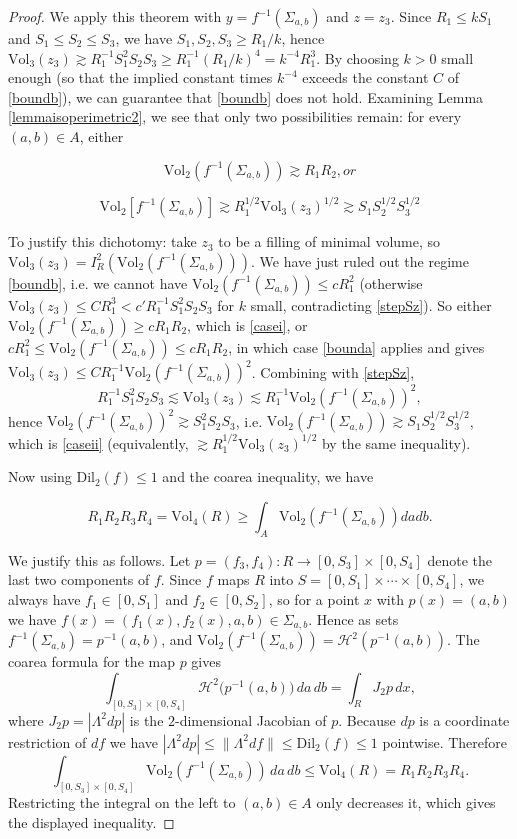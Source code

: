 \documentclass{amsart}
\newtheorem*{theorem 1}{Theorem 1}
\newtheorem*{theorem 2}{Theorem 2}
\newtheorem*{theorem 3}{Theorem 3}
\numberwithin{equation}{section}
\newcommand{\Dil}{\textrm{Dil}}
\newcommand{\Vol}{\textrm{Vol}}
\begin{document}
\begin{proof}
We apply this theorem with $y = f^{-1}(\Sigma_{a,b})$ and $z = z_3$.   Since $R_1 \le k S_1$ and $S_1 \le S_2 \le S_3$, we have $S_1, S_2, S_3 \ge R_1/k$, hence $\Vol_3(z_3) \gtrsim R_1^{-1} S_1^2 S_2 S_3 \ge R_1^{-1}(R_1/k)^4 = k^{-4} R_1^3$.   By choosing $k > 0$ small enough (so that the implied constant times $k^{-4}$ exceeds the constant $C$ of \eqref{boundb}),  we can guarantee that \eqref{boundb} does not hold.   Examining Lemma \ref{lemmaisoperimetric2},  we see that only two possibilities remain: for every $(a,b) \in A$,  either

\begin{equation} \label{casei} \Vol_2(f^{-1}(\Sigma_{a,b})) \gtrsim R_1 R_2,  or \end{equation}

\begin{equation} \label{caseii} \Vol_2[f^{-1}(\Sigma_{a,b})] \gtrsim R_1^{1/2} \Vol_3(z_3)^{1/2} \gtrsim S_1 S_2^{1/2} S_3^{1/2} \end{equation}

To justify this dichotomy: take $z_3$ to be a filling of minimal
volume, so $\Vol_3(z_3) = I_R^2(\Vol_2(f^{-1}(\Sigma_{a,b})))$.
We have just ruled out the regime \eqref{boundb}, i.e. we cannot
have $\Vol_2(f^{-1}(\Sigma_{a,b})) \le c R_1^2$ (otherwise
$\Vol_3(z_3) \le C R_1^3 < c' R_1^{-1} S_1^2 S_2 S_3$ for $k$ small,
contradicting \eqref{stepSz}).  So either
$\Vol_2(f^{-1}(\Sigma_{a,b})) \ge c R_1 R_2$, which is
\eqref{casei}, or $c R_1^2 \le \Vol_2(f^{-1}(\Sigma_{a,b})) \le c
R_1 R_2$, in which case \eqref{bounda} applies and gives
$\Vol_3(z_3) \le C R_1^{-1}\Vol_2(f^{-1}(\Sigma_{a,b}))^2$.
Combining with \eqref{stepSz},
$$ R_1^{-1} S_1^2 S_2 S_3 \lesssim \Vol_3(z_3) \lesssim R_1^{-1}
   \Vol_2(f^{-1}(\Sigma_{a,b}))^2, $$
hence $\Vol_2(f^{-1}(\Sigma_{a,b}))^2 \gtrsim S_1^2 S_2 S_3$, i.e.
$\Vol_2(f^{-1}(\Sigma_{a,b})) \gtrsim S_1 S_2^{1/2} S_3^{1/2}$,
which is \eqref{caseii} (equivalently, $\gtrsim R_1^{1/2}
\Vol_3(z_3)^{1/2}$ by the same inequality).

Now using $\Dil_2(f) \le 1$ and the coarea inequality,  we have

$$ R_1 R_2 R_3 R_4 = \Vol_4 (R) \ge \int_{A} \Vol_2(f^{-1}(\Sigma_{a,b})) da db. $$

We justify this as follows.  Let $p = (f_3, f_4): R \to [0,S_3]
\times [0, S_4]$ denote the last two components of $f$.  Since $f$
maps $R$ into $S = [0,S_1]\times\cdots\times[0,S_4]$, we always have
$f_1 \in [0,S_1]$ and $f_2 \in [0,S_2]$, so for a point $x$ with
$p(x) = (a,b)$ we have $f(x) = (f_1(x),f_2(x),a,b) \in
\Sigma_{a,b}$.  Hence as sets $f^{-1}(\Sigma_{a,b}) = p^{-1}(a,b)$,
and $\Vol_2(f^{-1}(\Sigma_{a,b})) = \mathcal H^2(p^{-1}(a,b))$.
The coarea formula for the map $p$ gives
$$ \int_{[0,S_3]\times[0,S_4]} \mathcal H^2\big(p^{-1}(a,b)\big)\,da\,db
   = \int_R J_2 p \, dx, $$
where $J_2 p = |\Lambda^2 dp|$ is the $2$-dimensional Jacobian of
$p$.  Because $dp$ is a coordinate restriction of $df$ we have
$|\Lambda^2 dp| \le \|\Lambda^2 df\| \le \Dil_2(f) \le 1$
pointwise.  Therefore
$$ \int_{[0,S_3]\times[0,S_4]} \Vol_2(f^{-1}(\Sigma_{a,b}))\,da\,db
   \le \Vol_4(R) = R_1 R_2 R_3 R_4. $$
Restricting the integral on the left to $(a,b)\in A$ only decreases
it, which gives the displayed inequality.


\end{proof}
\end{document}
